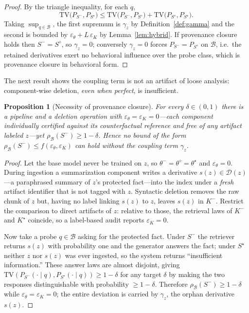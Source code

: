 \documentclass[10pt,journal,compsoc]{IEEEtran}
\newtheorem{proposition}{Proposition}
\begin{document}
\begin{proof}
By the triangle inequality, for each $q$,
\[
\mathrm{TV}\!\big(P_{S^{-}},P_{S^{\star}}\big)
\le
\mathrm{TV}\!\big(P_{S^{-}},P_{S^{\diamond}}\big)
+\mathrm{TV}\!\big(P_{S^{\diamond}},P_{S^{\star}}\big).
\]
Taking $\sup_{q\in\mathcal{B}}$, the first supremum is $\gamma_{z}$ by
Definition~\ref{def:gamma} and the second is bounded by
$\varepsilon_{\theta}+L\,\varepsilon_{K}$ by Lemma~\ref{lem:hybrid}.
If provenance closure holds then $S^{-}=S^{\diamond}$, so
$\gamma_{z}=0$; conversely $\gamma_{z}=0$ forces
$P_{S^{-}}=P_{S^{\diamond}}$ on $\mathcal{B}$, i.e.\ the retained
derivatives exert no behavioral influence over the probe class, which is
provenance closure in behavioral form.
\end{proof}

The next result shows the coupling term is not an artifact of loose
analysis: component-wise deletion, \emph{even when perfect}, is
insufficient.

\begin{proposition}[Necessity of provenance closure]
\label{prop:necessity}
For every $\delta\in(0,1)$ there is a pipeline and a deletion operation
with $\varepsilon_{\theta}=\varepsilon_{K}=0$---each component
individually certified against its counterfactual reference and free of
any artifact \emph{labeled} $z$---yet
$\rho_{\mathcal{B}}(S^{-})\ge 1-\delta$. Hence no bound of the form
$\rho_{\mathcal{B}}(S^{-})\le f(\varepsilon_{\theta},\varepsilon_{K})$
can hold without the coupling term $\gamma_{z}$.
\end{proposition}

\begin{proof}
Let the base model never be trained on $z$, so
$\theta^{-}=\theta^{\diamond}=\theta^{\star}$ and
$\varepsilon_{\theta}=0$. During ingestion a summarization component
writes a derivative $s(z)\in\mathcal{D}(z)$---a paraphrased summary of
$z$'s protected fact---into the index under a \emph{fresh} artifact
identifier that is not tagged with $z$. Syntactic deletion removes the
raw chunk of $z$ but, having no label linking $s(z)$ to $z$, leaves
$s(z)$ in $K^{-}$. Restrict the comparison to direct artifacts of $z$:
relative to those, the retrieval laws of $K^{-}$ and $K^{\star}$
coincide, so a label-based audit reports $\varepsilon_{K}=0$.

Now take a probe $q\in\mathcal{B}$ asking for the protected fact. Under
$S^{-}$ the retriever returns $s(z)$ with probability one and the
generator answers the fact; under $S^{\star}$ neither $z$ nor $s(z)$ was
ever ingested, so the system returns ``insufficient information.'' These
answer laws are almost disjoint, giving
$\mathrm{TV}(P_{S^{-}}(\cdot\mid q),P_{S^{\star}}(\cdot\mid q))\ge1-\delta$
for any target $\delta$ by making the two responses distinguishable with
probability $\ge1-\delta$. Therefore $\rho_{\mathcal{B}}(S^{-})\ge1-\delta$
while $\varepsilon_{\theta}=\varepsilon_{K}=0$; the entire deviation is
carried by $\gamma_{z}$, the orphan derivative $s(z)$.
\end{proof}
\end{document}
